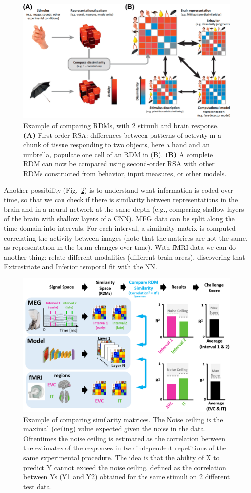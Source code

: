 \begin{figure}[!ht]
    \centering
    \captionsetup{width=.8\linewidth}
    \includegraphics[width=0.7\linewidth]{images/rsa.png}
    \caption{Example of comparing RDMs, with 2 stimuli and brain response. \textbf{(A)} First-order RSA: differences between patterns of activity in a chunk of tissue responding to two objects, here a hand and an umbrella, populate one cell of an RDM in (B). \textbf{(B)} A complete RDM can now be compared using second-order RSA with other RDMs constructed from behavior, input measures, or other models.}
    \label{fig:rsa}
\end{figure}

Another possibility (Fig.~\ref{fig:rsa_2}) is to understand what information is coded over time, so that we can check if there is similarity between representations in the brain and in a neural network at the same depth (e.g., comparing shallow layers of the brain with shallow layers of a CNN). MEG data can be split along the time domain into intervals. For each interval, a similarity matrix is computed correlating the activity between images (note that the matrices are not the same, as representation in the brain changes over time). With fMRI data we can do another thing: relate different modalities (different brain areas), discovering that Extrastriate and Inferior temporal fit with the NN.\\

\begin{figure}[!ht]
    \centering
    \captionsetup{width=.8\linewidth}
    \includegraphics[width=0.7\linewidth]{images/rsa_2.png}
    \caption{Example of comparing similarity matrices. The Noise ceiling is  the maximal (ceiling) value expected given the noise in the data. Oftentimes the noise ceiling is estimated as the correlation between the estimates of the responses in two independent repetitions of the same experimental procedure. The idea is that the ability of X to predict Y cannot exceed the noise ceiling, defined as the correlation between Ys (Y1 and Y2) obtained for the same stimuli on 2 different test data.}
    \label{fig:rsa_2}
\end{figure}

